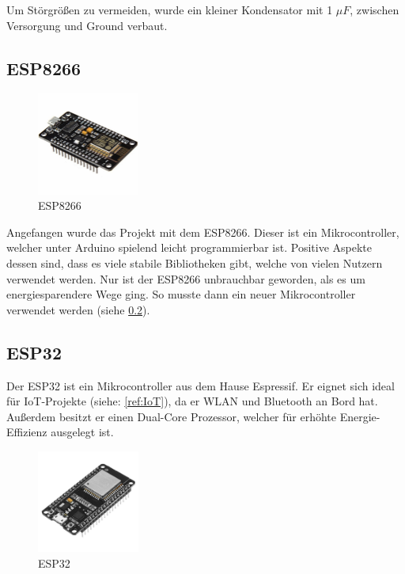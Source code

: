     Um Störgrößen zu vermeiden, wurde ein kleiner Kondensator mit 1 $\mu F$, zwischen Versorgung und Ground verbaut. 

\pagebreak

\subsection{ESP8266}\label{ref:ESP8266}

    \begin{figure}[H]
        \centering
        \includegraphics[width=0.3\textwidth]{./media/images/ESP8266.jpg}
        \caption{ESP8266\cite{bib:ESP8266}}
        \label{fig:ESP8266}
    \end{figure}

    Angefangen wurde das Projekt mit dem ESP8266. Dieser ist ein Mikrocontroller, welcher unter Arduino spielend leicht programmierbar ist. Positive Aspekte dessen sind, dass es viele stabile Bibliotheken gibt, welche von vielen Nutzern verwendet werden. Nur ist der ESP8266 unbrauchbar geworden, als es um energiesparendere Wege ging. So musste dann ein neuer Mikrocontroller verwendet werden (siehe \ref{ref:ESP32}).

\subsection{ESP32} \label{ref:ESP32}

    Der ESP32 ist ein Mikrocontroller aus dem Hause Espressif. Er eignet sich ideal für IoT-Projekte (siehe: \ref{ref:IoT}), da er WLAN und Bluetooth an Bord hat. Außerdem besitzt er einen Dual-Core Prozessor, welcher für erhöhte Energie-Effizienz ausgelegt ist. 
    
    \begin{flushright}
            \cite{bib:ESP32Erw}
    \end{flushright}

    \begin{figure}[H]
        \centering
        \includegraphics[width=0.3\textwidth]{./media/images/ESP32.jpeg}
        \caption{ESP32 \cite{bib:ESP32}}
        \label{fig:ESP32}
    \end{figure}

